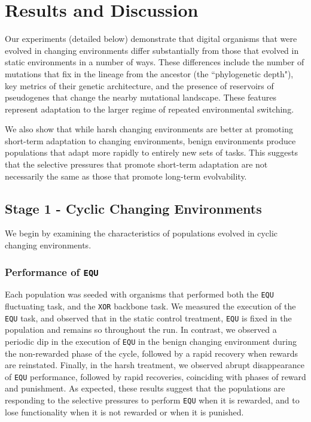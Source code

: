 \documentclass[10pt,letterpaper,final]{article}
\begin{document}
\section*{Results and Discussion}
Our experiments (detailed below) demonstrate that digital organisms that were evolved in changing environments differ substantially from those that evolved in static environments in a number of ways. These differences include the number of mutations that fix in the lineage from the ancestor (the ``phylogenetic depth"), key metrics of their genetic architecture, and the presence of reservoirs of pseudogenes that change the nearby mutational landscape. These features represent adaptation to the larger regime of repeated environmental switching. 

We also show that while harsh changing environments are better at promoting short-term adaptation to changing environments, benign environments produce populations that adapt more rapidly to entirely new sets of tasks. This suggests that the selective pressures that promote short-term adaptation are not necessarily the same as those that promote long-term evolvability.

\subsection*{Stage 1 - Cyclic Changing Environments}
We begin by examining the characteristics of populations evolved in cyclic changing environments.

\subsubsection*{Performance of \texttt{EQU}}
Each population was seeded with organisms that performed both the \texttt{EQU} fluctuating task, and the \texttt{XOR} backbone task. We measured the execution of the \texttt{EQU} task, and observed that in the static control treatment, \texttt{EQU} is fixed in the population and remains so throughout the run. In contrast, we observed a periodic dip in the execution of \texttt{EQU} in the benign changing environment during the non-rewarded phase of the cycle, followed by a rapid recovery when rewards are reinstated. Finally, in the harsh treatment, we observed abrupt disappearance of \texttt{EQU} performance, followed by rapid recoveries, coinciding with phases of reward and punishment. As expected, these results suggest that the populations are responding to the selective pressures to perform \texttt{EQU} when it is rewarded, and to lose functionality when it is not rewarded or when it is punished.
\end{document}
